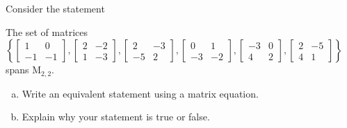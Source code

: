 
\begin{exerciseStatement}


Consider the statement 
\begin{center}\begin{minipage}{0.8\textwidth}
 The set of matrices \( \left\{ \left[\begin{array}{cc}
1 & 0 \\
-1 & -1
\end{array}\right] , \left[\begin{array}{cc}
2 & -2 \\
1 & -3
\end{array}\right] , \left[\begin{array}{cc}
2 & -3 \\
-5 & 2
\end{array}\right] , \left[\begin{array}{cc}
0 & 1 \\
-3 & -2
\end{array}\right] , \left[\begin{array}{cc}
-3 & 0 \\
4 & 2
\end{array}\right] , \left[\begin{array}{cc}
2 & -5 \\
4 & 1
\end{array}\right] \right\} \) spans \(\mathrm{M}_{2,2}\). 
\end{minipage}\end{center}
    


\begin{enumerate}[(a)]
\item  Write an equivalent statement using a matrix equation.
\item  Explain why your statement is true or false.
\end{enumerate}
    
\end{exerciseStatement}
    
